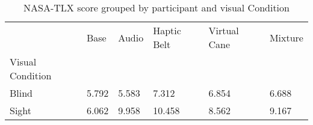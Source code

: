 
\begin{table}[!htb]
\centering
\caption{NASA-TLX score grouped by participant and visual Condition}
\label{tab:nasa_average_group}
\begin{tabular}{llllll}
\toprule
{} &  Base &  Audio &  Haptic Belt &  Virtual Cane &  Mixture \\
Visual Condition &       &        &              &               &          \\
\midrule
Blind            & 5.792 &  5.583 &        7.312 &         6.854 &    6.688 \\
Sight            & 6.062 &  9.958 &       10.458 &         8.562 &    9.167 \\
\bottomrule
\end{tabular}
\end{table}


